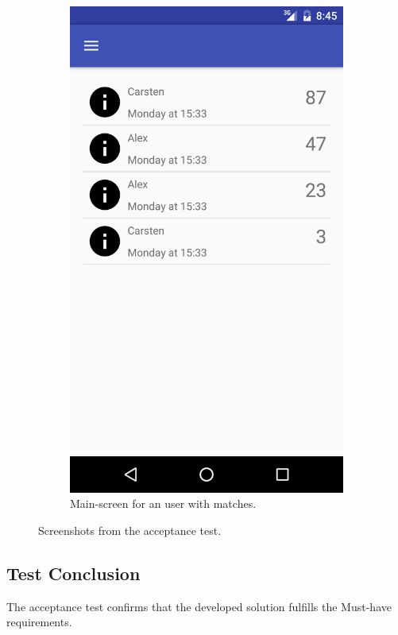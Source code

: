 \begin{figure}[ht!]
\begin{subfigure}[b]{0.24\textwidth}
        \includegraphics[width=\textwidth]{figures/s4test/testmain.png}
        \caption{Main-screen for an user with matches.}
        \label{s4tp:testmain}
\end{subfigure}
\caption{Screenshots from the acceptance test.}
\end{figure}

\subsection{Test Conclusion}
The acceptance test confirms that the developed solution fulfills the Must-have requirements.

